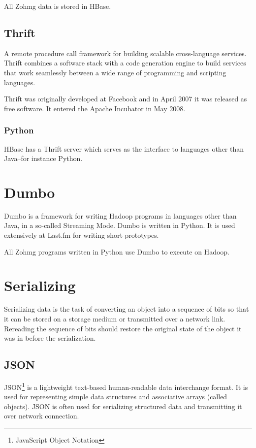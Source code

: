 \documentclass[a4paper,10pt]{book}
\begin{document}
All Zohmg data is stored in HBase.


\subsection{Thrift}

A remote procedure call framework for building scalable cross-language
services. Thrift combines a software stack with a code generation engine to
build services that work seamlessly between a wide range of programming and
scripting languages. \cite{thrift}

Thrift was originally developed at Facebook and in April 2007 it was
released as free software. It entered the Apache Incubator in May 2008.


\subsubsection{Python}

HBase has a Thrift server which serves as the interface to languages other
than Java--for instance Python.



\section{Dumbo}

Dumbo is a framework for writing Hadoop programs in languages other than Java, in a so-called Streaming Mode. Dumbo is written in Python. It is used extensively at Last.fm for writing short prototypes.

All Zohmg programs written in Python use Dumbo to execute on Hadoop.



\section{Serializing}

Serializing data is the task of converting an object into a sequence of
bits so that it can be stored on a storage medium or transmitted over a
network link. Rereading the sequence of bits should restore the original
state of the object it was in before the serialization.


\subsection{JSON}

JSON\footnote{JavaScript Object Notation} is a lightweight text-based
human-readable data interchange format. It is used for representing simple
data structures and associative arrays (called objects). JSON is often used
for serializing structured data and transmitting it over network
connection.
\end{document}
